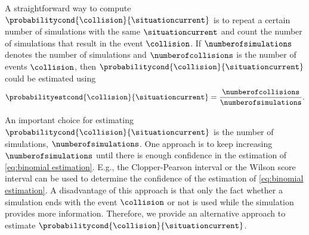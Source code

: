 A straightforward way to compute $\probabilitycond{\collision}{\situationcurrent}$ is to repeat a certain number of simulations with the same $\situationcurrent$ and count the number of simulations that result in the event $\collision$.
If $\numberofsimulations$ denotes the number of simulations and $\numberofcollisions$ is the number of events $\collision$, then $\probabilitycond{\collision}{\situationcurrent}$ could be estimated using
\begin{equation}
	\label{eq:binomial estimation}
	\probabilityestcond{\collision}{\situationcurrent}
	= \frac{\numberofcollisions}{\numberofsimulations}.
\end{equation}

An important choice for estimating $\probabilitycond{\collision}{\situationcurrent}$ is the number of simulations, $\numberofsimulations$.
One approach is to keep increasing $\numberofsimulations$ until there is enough confidence in the estimation of \cref{eq:binomial estimation}.
E.g., the Clopper-Pearson interval \autocite{clopper1934use} or the Wilson score interval \autocite{wilson1927probable} can be used to determine the confidence of the estimation of \cref{eq:binomial estimation}.
A disadvantage of this approach is that only the fact whether a simulation ends with the event $\collision$ or not is used while the simulation provides more information. 
Therefore, we provide an alternative approach to estimate $\probabilitycond{\collision}{\situationcurrent}$.

